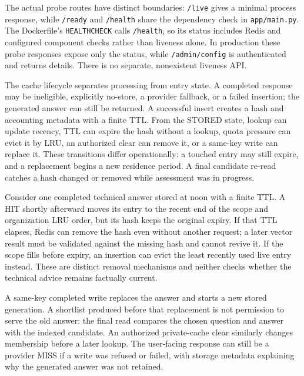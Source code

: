 The actual probe routes have distinct boundaries: \texttt{/live} gives a minimal process response, while \texttt{/ready} and \texttt{/health} share the dependency check in \texttt{app/main.py}. The Dockerfile's \texttt{HEALTHCHECK} calls \texttt{/health}, so its status includes Redis and configured component checks rather than liveness alone. In production these probe responses expose only the status, while \texttt{/admin/config} is authenticated and returns details. There is no separate, nonexistent liveness API.

The cache lifecycle separates processing from entry state. A completed response may be ineligible, explicitly no-store, a provider fallback, or a failed insertion; the generated answer can still be returned. A successful insert creates a hash and accounting metadata with a finite TTL. From the STORED state, lookup can update recency, TTL can expire the hash without a lookup, quota pressure can evict it by LRU, an authorized clear can remove it, or a same-key write can replace it. These transitions differ operationally: a touched entry may still expire, and a replacement begins a new residence period. A final candidate re-read catches a hash changed or removed while assessment was in progress.

Consider one completed technical answer stored at noon with a finite TTL. A HIT shortly afterward moves its entry to the recent end of the scope and organization LRU order, but its hash keeps the original expiry. If that TTL elapses, Redis can remove the hash even without another request; a later vector result must be validated against the missing hash and cannot revive it. If the scope fills before expiry, an insertion can evict the least recently used live entry instead. These are distinct removal mechanisms and neither checks whether the technical advice remains factually current.

A same-key completed write replaces the answer and starts a new stored generation. A shortlist produced before that replacement is not permission to serve the old answer: the final read compares the chosen question and answer with the indexed candidate. An authorized private-cache clear similarly changes membership before a later lookup. The user-facing response can still be a provider MISS if a write was refused or failed, with storage metadata explaining why the generated answer was not retained.
